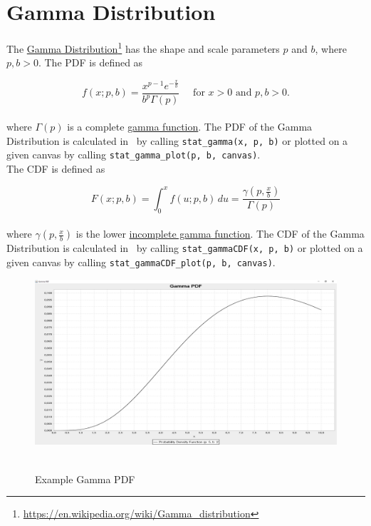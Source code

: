 	\section{Gamma Distribution}

		The \href{https://en.wikipedia.org/wiki/Gamma_distribution}{Gamma Distribution}\footnote{\url{https://en.wikipedia.org/wiki/Gamma_distribution}} has the shape and scale parameters $p$ and $b$, where $p,b > 0$. The \ac{PDF} is defined as

		$$f(x;p,b) =  \frac{x^{p-1}e^{-\frac{x}{b}}}{b^p\Gamma(p)} \quad \text{ for } x > 0 \text{ and } p, b > 0.$$
		\\[0.3cm]
		where $\Gamma(p)$ is a complete \href{https://en.wikipedia.org/wiki/Gamma_function}{gamma function}. The \ac{PDF} of the Gamma Distribution is calculated in \setlx\ by calling \lstinline{stat_gamma(x, p, b)} or plotted on a given canvas by calling \lstinline{stat_gamma_plot(p, b, canvas)}.
		\\[0.3cm]
		The \ac{CDF} is defined as

		$$F(x;p,b) = \int_0^x f(u;p,b)\,du = \frac{\gamma\left(p, \frac{x}{b}\right)}{\Gamma(p)}$$
		\\[0.3cm]
		where $\gamma\left(p, \frac{x}{b}\right)$ is the lower \href{https://en.wikipedia.org/wiki/Incomplete_gamma_function}{incomplete gamma function}. The \ac{CDF} of the Gamma Distribution is calculated in \setlx\ by calling \lstinline{stat_gammaCDF(x, p, b)} or plotted on a given canvas by calling \lstinline{stat_gammaCDF_plot(p, b, canvas)}.

		\begin{figure}[H]
			\centering
			\includegraphics[width=1\textwidth]{Figures/implemented_functions/gamma_pdf}~\\
			\caption{Example Gamma PDF}
			\label{fig:gamma_pdf}
		\end{figure}


